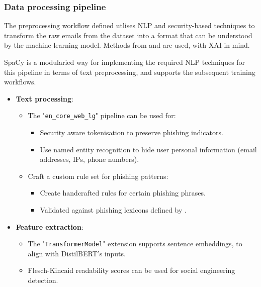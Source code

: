 
\subsubsection*{Data processing pipeline}
The preprocessing workflow defined utlises NLP and security-based techniques to transform the raw emails from the dataset into a format that can be understood by the machine learning model. Methods from \cite{zamir2020phishing} and \cite{ahmad2024across} are used, with XAI in mind.\newline

\noindent SpaCy is a modularied way for implementing the required NLP techniques for this pipeline in terms of text preprocessing, and supports the subsequent training workflows.

\begin{itemize}
  \item \textbf{Text processing}:
  \begin{itemize}
    \item The "\texttt{en\_core\_web\_lg}" pipeline can be used for:
    \begin{itemize}
      \item Security aware tokenisation to preserve phishing indicators.
      \item Use named entity recognition to hide user personal information (email addresses, IPs, phone numbers).
    \end{itemize}
    \item Craft a custom rule set for phishing patterns:
    \begin{itemize}
      \item Create handcrafted rules for certain phishing phrases.
      \item Validated against phishing lexicons defined by \cite{greco2023explaining}.
    \end{itemize}
  \end{itemize}
  \item \textbf{Feature extraction}:
  \begin{itemize}
    \item The "\texttt{TransformerModel}" extension supports sentence embeddings, to align with DistilBERT's inputs.
    \item Flesch-Kincaid readability scores can be used for social engineering detection.
  \end{itemize}
\end{itemize}


